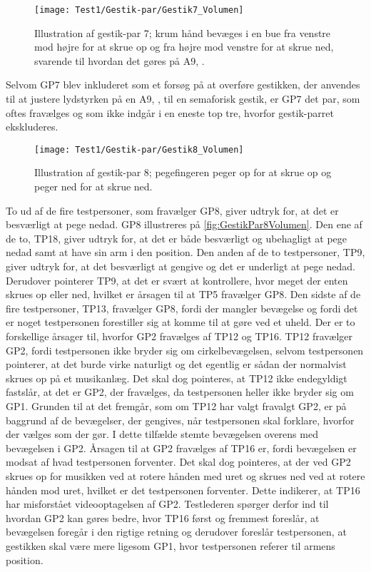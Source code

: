 %
\begin{figure}[H]
	\centering
	\texttt{[image: Test1/Gestik-par/Gestik7\_Volumen]}
	\caption{Illustration af gestik-par 7; krum hånd bevæges i en bue fra venstre mod højre for at skrue op og fra højre mod venstre for at skrue ned, svarende til hvordan det gøres på A9, \parencite{WEB:BeoplayA9}.}
	\label{fig:GestikPar7Volumen}
\end{figure}
\noindent
%
Selvom GP7 blev inkluderet som et forsøg på at overføre gestikken, der anvendes til at justere lydstyrken på en A9, \parencite{WEB:BeoplayA9}, til en semaforisk gestik, er GP7 det par, som oftes fravælges og som ikke indgår i en eneste top tre, hvorfor gestik-parret ekskluderes.
%
\begin{figure}[H]
	\centering
	\texttt{[image: Test1/Gestik-par/Gestik8\_Volumen]}
	\caption{Illustration af gestik-par 8; pegefingeren peger op for at skrue op og peger ned for at skrue ned.}
	\label{fig:GestikPar8Volumen}
\end{figure}
\noindent
%
To ud af de fire testpersoner, som fravælger GP8, giver udtryk for, at det er besværligt at pege nedad. GP8 illustreres på \autoref{fig:GestikPar8Volumen}. Den ene af de to, TP18, giver udtryk for, at det er både besværligt og ubehagligt at pege nedad samt at have sin arm i den position. Den anden af de to testpersoner, TP9, giver udtryk for, at det besværligt at gengive og det er underligt at pege nedad. Derudover pointerer TP9, at det er svært at kontrollere, hvor meget der enten skrues op eller ned, hvilket er årsagen til at TP5 fravælger GP8. Den sidste af de fire testpersoner, TP13, fravælger GP8, fordi der mangler bevægelse og fordi det er noget testpersonen forestiller sig at komme til at gøre ved et uheld. \blankline 
%
Der er to forskellige årsager til, hvorfor GP2 fravælges af TP12 og TP16. TP12 fravælger GP2, fordi testpersonen ikke bryder sig om cirkelbevægelsen, selvom testpersonen pointerer, at det burde virke naturligt og det egentlig er sådan der normalvist skrues op på et musikanlæg. Det skal dog pointeres, at TP12 ikke endegyldigt fastslår, at det er GP2, der fravælges, da testpersonen heller ikke bryder sig om GP1. Grunden til at det fremgår, som om TP12 har valgt fravalgt GP2, er på baggrund af de bevægelser, der gengives, når testpersonen skal forklare, hvorfor der vælges som der gør. I dette tilfælde stemte bevægelsen overens med bevægelsen i GP2. Årsagen til at GP2 fravælges af TP16 er, fordi bevægelsen er modsat af hvad testpersonen forventer. Det skal dog pointeres, at der ved GP2 skrues op for musikken ved at rotere hånden med uret og skrues ned ved at rotere hånden mod uret, hvilket er det testpersonen forventer. Dette indikerer, at TP16 har misforstået videooptagelsen af GP2. Testlederen spørger derfor ind til hvordan GP2 kan gøres bedre, hvor TP16 først og fremmest foreslår, at bevægelsen foregår i den rigtige retning og derudover foreslår testpersonen, at gestikken skal være mere ligesom GP1, hvor testpersonen referer til armens position. 

